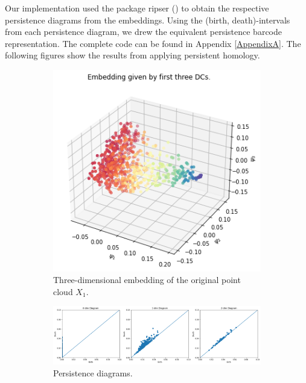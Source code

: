 Our implementation used the package ripser (\cite{ctralie2018ripser}) to obtain the respective persistence diagrams from the embeddings. Using the (birth, death)-intervals from each persistence diagram, we drew the equivalent persistence barcode representation. The complete code can be found in Appendix \ref{AppendixA}. The following figures show the results from applying persistent homology.
\begin{figure}[H]
\centering
\begin{subfigure}[b]{0.2\textwidth}
    \includegraphics[width=\textwidth]{figures/topology/X1_embedding.png}
    \caption{Three-dimensional embedding of the original point cloud $X_1$.}
\end{subfigure}
\hfill
\begin{subfigure}[b]{0.75\textwidth}
    \includegraphics[width=\textwidth]{figures/topology/X1_H0.png}
    \caption{Persistence diagrams.}
\end{subfigure}
\begin{subfigure}[b]{0.25\textwidth}

\end{subfigure}
\end{figure}
